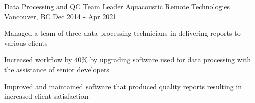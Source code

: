 \begin{cventries}
  \cventry
    {Data Processing and QC Team Leader} %
    {Aquacoustic Remote Technologies} %
    {Vancouver, BC} %
    {Dec 2014 - Apr 2021} %
    {
      \begin{cvitems} %
        \item{Managed a team of three data processing technicians in delivering reports to various clients}
        \item{Increased workflow by 40\% by upgrading software used for data processing with the assistance of senior developers}
        \item{Improved and maintained software that produced quality reports resulting in increased client satisfaction}
      \end{cvitems}
    }

\end{cventries}
